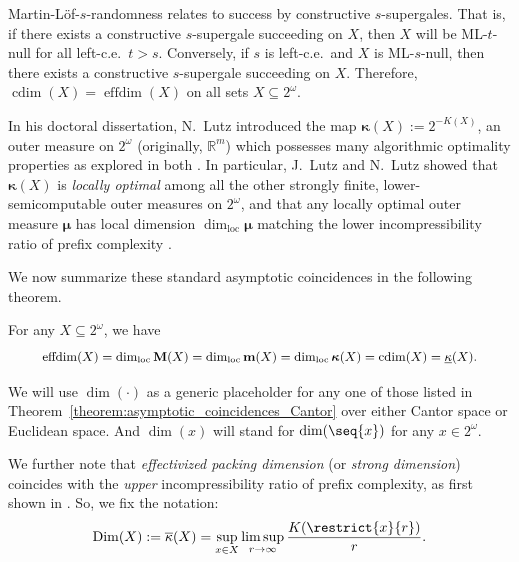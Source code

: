 Martin-L{\"o}f-$s$-randomness relates to success by constructive $s$-supergales. That is, if there exists a constructive $s$-supergale succeeding on $X$, then $X$ will be ML-$t$-null for all left-c.e.~$t > s$. Conversely, if $s$ is left-c.e.~and $X$ is ML-$s$-null, then there exists a constructive $s$-supergale succeeding on $X$. Therefore, $\operatorname{cdim}(X) = \operatorname{effdim}(X)$ on all sets $X \subseteq 2^\omega$. 


In his doctoral dissertation, N.~Lutz introduced the map $\boldsymbol{\kappa}(X) := 2^{-K(X)}$, an outer measure on $2^\omega$ (originally, $\mathbb{R}^m$) which possesses many algorithmic optimality properties as explored in both \cite{Lut17b, LL20}. In particular, J.~Lutz and N.~Lutz showed that $\boldsymbol{\kappa}(X)$ is \textit{locally optimal} among all the other strongly finite, lower-semicomputable outer measures on $2^\omega$, and that any locally optimal outer measure $\boldsymbol{\mu}$ has local dimension $\dim_{\operatorname{loc}}\boldsymbol{\mu}$ matching the lower incompressibility ratio of prefix complexity \cite{LL20}. 

We now summarize these standard asymptotic coincidences in the following theorem.

\begin{theorem}
    \label{theorem:asymptotic_coincidences_Cantor}
    For any $X \subseteq 2^\omega$, we have
    \begin{align*}
        \small 
        \operatorname{effdim}(X) = \dim_{\operatorname{loc}} \mathbf{M}(X) = \dim_{\operatorname{loc}} \mathbf{m}(X) = \dim_{\operatorname{loc}} \boldsymbol{\kappa}(X) = \operatorname{cdim}(X) = \underline{\kappa}(X).
    \end{align*}
\end{theorem}

We will use $\dim(\cdot)$ as a generic placeholder for any one of those listed in Theorem~\ref{theorem:asymptotic_coincidences_Cantor} over either Cantor space or Euclidean space. And $\dim(x)$ will stand for $\dim(\seq{x})$ for any $x \in 2^\omega$. 

We further note that \textit{effectivized packing dimension} (or \textit{strong dimension}) coincides with the \textit{upper} incompressibility ratio of prefix complexity, as first shown in  \cite{AHLE07}. So, we fix the notation:
\begin{align*}
    \operatorname{Dim}(X) := \overline{\kappa}(X) = \sup_{x \in X} \limsup_{r \to \infty} \frac{K(\restrict{x}{r})}{r}.
\end{align*}

